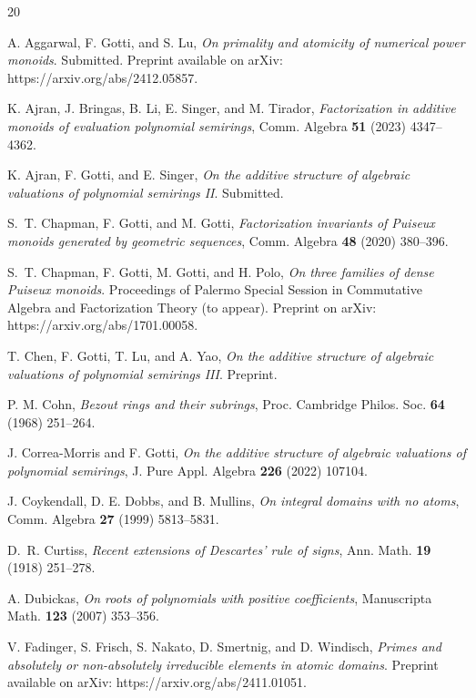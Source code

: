 \documentclass[11pt]{amsart}
\theoremstyle{definition}
\theoremstyle{remark}
\numberwithin{equation}{section}
\begin{document}
\bigskip
\begin{thebibliography}{20}
	
	  A. Aggarwal, F. Gotti, and S. Lu, \emph{On primality and atomicity of numerical power monoids}. Submitted. Preprint available on arXiv: https://arxiv.org/abs/2412.05857.
	
	 K. Ajran, J. Bringas, B. Li, E. Singer, and M. Tirador, \emph{Factorization in additive monoids of evaluation polynomial semirings}, Comm. Algebra \textbf{51} (2023) 4347--4362.
	
	 K. Ajran, F. Gotti, and E. Singer, \emph{On the additive structure of algebraic valuations of polynomial semirings II}. Submitted.
	
	 S.~T. Chapman, F. Gotti, and M. Gotti, \emph{Factorization invariants of Puiseux monoids generated by geometric sequences}, Comm. Algebra \textbf{48} (2020) 380--396.
	
	 S.~T. Chapman, F. Gotti, M. Gotti, and H. Polo, \emph{On three families of dense Puiseux monoids}. Proceedings of Palermo Special Session in Commutative Algebra and Factorization Theory (to appear). Preprint on arXiv: https://arxiv.org/abs/1701.00058.
	
	 T. Chen, F. Gotti, T. Lu, and A. Yao, \emph{On the additive structure of algebraic valuations of polynomial semirings III}. Preprint.
	
	 P. M. Cohn, \emph{Bezout rings and their subrings}, Proc. Cambridge Philos. Soc. \textbf{64} (1968) 251--264.
	
	 J. Correa-Morris and F. Gotti, \emph{On the additive structure of algebraic valuations of polynomial semirings}, J. Pure Appl. Algebra \textbf{226} (2022) 107104.

     J. Coykendall, D. E. Dobbs, and B. Mullins, \emph{On integral domains with no atoms}, Comm. Algebra \textbf{27} (1999) 5813--5831.
    
	 D.~R. Curtiss, \emph{Recent extensions of Descartes' rule of signs}, Ann. Math. \textbf{19} (1918) 251--278.
	
	 A. Dubickas, \emph{On roots of polynomials with positive coefficients}, Manuscripta Math. \textbf{123} (2007) 353--356.
	
	 V. Fadinger, S. Frisch, S. Nakato, D. Smertnig, and D. Windisch, \emph{Primes and absolutely or non-absolutely irreducible elements in atomic domains}. Preprint available on arXiv: https://arxiv.org/abs/2411.01051.
	

\end{thebibliography}
\end{document}
